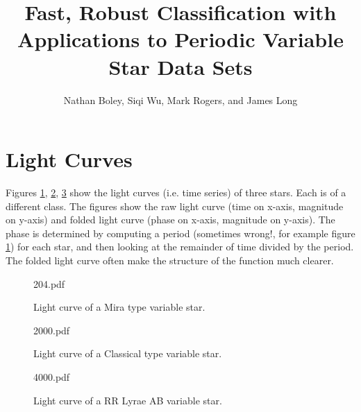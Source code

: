\documentclass[11pt]{article}
\begin{document}
\title{Fast, Robust Classification with Applications to Periodic Variable Star Data Sets}
\author{Nathan Boley, Siqi Wu, Mark Rogers, and James Long}
\maketitle

\section{Light Curves}

Figures \ref{fig:mira}, \ref{fig:cepheid}, \ref{fig:rrlyrae} show the light curves (i.e. time series) of three stars. Each is of a different class. The figures show the raw light curve (time on x-axis, magnitude on y-axis) and folded light curve (phase on x-axis, magnitude on y-axis). The phase is determined by computing a period (sometimes wrong!, for example figure \ref{fig:mira}) for each star, and then looking at the remainder of time divided by the period. The folded light curve often make the structure of the function much clearer.

\begin{figure}[h]
  \begin{center}
    \begin{includegraphics}[scale=.5]{204.pdf}
      \caption{Light curve of a Mira type variable star.\label{fig:mira}}
    \end{includegraphics}
  \end{center}
\end{figure}


\begin{figure}[h]
  \begin{center}
    \begin{includegraphics}[scale=.5]{2000.pdf}
      \caption{Light curve of a Classical type variable star.\label{fig:cepheid}}
    \end{includegraphics}
  \end{center}
\end{figure}


\begin{figure}[h]
  \begin{center}
    \begin{includegraphics}[scale=.5]{4000.pdf}
      \caption{Light curve of a RR Lyrae AB variable star.\label{fig:rrlyrae}}
    \end{includegraphics}
  \end{center}
\end{figure}
\end{document}
